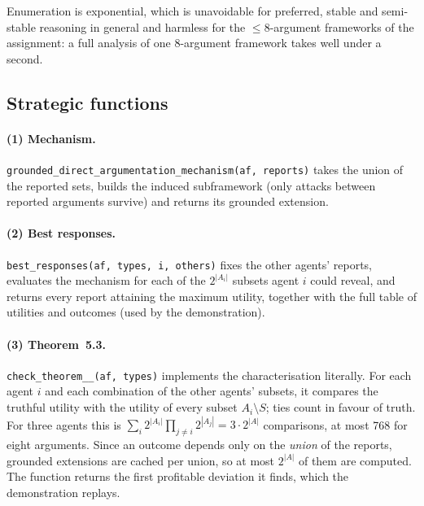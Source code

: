 \documentclass[11pt,a4paper]{article}
\newcommand{\code}[1]{{\let\origus\_\renewcommand{\_}{\origus\allowbreak}\texttt{#1}}}
\theoremstyle{definition}
\begin{document}
Enumeration is exponential, which is unavoidable for preferred, stable and semi-stable reasoning in
general and harmless for the $\le 8$-argument frameworks of the assignment: a full analysis of one
8-argument framework takes well under a second.

\subsection{Strategic functions}

\paragraph{(1) Mechanism.} \code{grounded\_direct\_argumentation\_mechanism(af, reports)} takes the
union of the reported sets, builds the induced subframework (only attacks between reported
arguments survive) and returns its grounded extension.

\paragraph{(2) Best responses.} \code{best\_responses(af, types, i, others)} fixes the other agents'
reports, evaluates the mechanism for each of the $2^{|A_i|}$ subsets agent $i$ could reveal, and
returns every report attaining the maximum utility, together with the full table of utilities and
outcomes (used by the demonstration).

\paragraph{(3) Theorem~5.3.} \code{check\_theorem\_5\_3(af, types)} implements the characterisation
literally. For each agent $i$ and each combination of the other agents' subsets, it compares the
truthful utility with the utility of every subset $A_i\setminus S$; ties count in favour of truth.
For three agents this is $\sum_i 2^{|A_i|}\prod_{j\ne i}2^{|A_j|}=3\cdot2^{|A|}$ comparisons, at most
768 for eight arguments. Since an outcome depends only on the \emph{union} of the reports, grounded
extensions are cached per union, so at most $2^{|A|}$ of them are computed. The function returns the
first profitable deviation it finds, which the demonstration replays.
\end{document}
